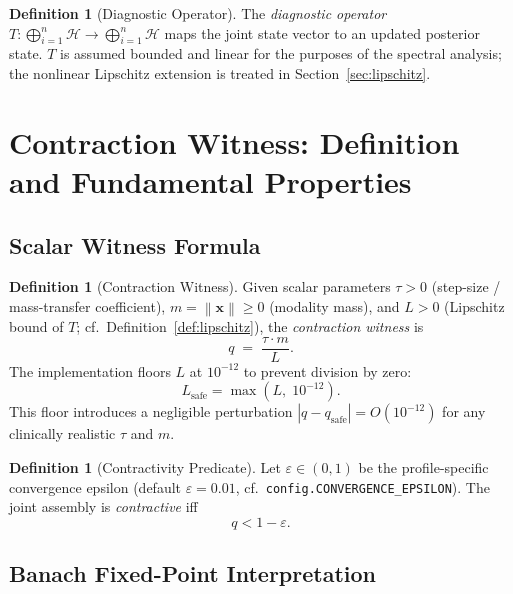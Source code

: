 \documentclass[11pt,a4paper]{article}
\theoremstyle{tealstyle}
\theoremstyle{definition}
\newtheorem{definition}[theorem]{Definition}
\newcommand{\Hilb}{\mathcal{H}}
\newcommand{\norm}[1]{\left\lVert #1 \right\rVert}
\newcommand{\abs}[1]{\left\lvert #1 \right\rvert}
\newcommand{\eps}{\varepsilon}
\newcommand{\qwit}{q}
\newcommand{\Tau}{\tau}
\begin{document}
\begin{definition}[Diagnostic Operator]
\label{def:operator}
The \emph{diagnostic operator}
$T\colon \bigoplus_{i=1}^n \Hilb \to \bigoplus_{i=1}^n \Hilb$
maps the joint state vector to an updated posterior state.
$T$ is assumed bounded and linear for the purposes of the spectral analysis;
the nonlinear Lipschitz extension is treated in
Section~\ref{sec:lipschitz}.
\end{definition}

\section{Contraction Witness: Definition and Fundamental Properties}
\label{sec:witness}

\subsection{Scalar Witness Formula}
\label{sec:witness-formula}

\begin{definition}[Contraction Witness]
\label{def:witness}
Given scalar parameters $\Tau > 0$ (step-size / mass-transfer coefficient),
$m = \norm{\bm{x}} \ge 0$ (modality mass), and
$L > 0$ (Lipschitz bound of $T$; cf.\ Definition~\ref{def:lipschitz}),
the \emph{contraction witness} is
\begin{equation}
  \label{eq:witness}
  \qwit \;=\; \frac{\Tau \cdot m}{L}.
\end{equation}
The implementation floors $L$ at $10^{-12}$ to prevent division by zero:
\[
  L_{\text{safe}} = \max(L,\;10^{-12}).
\]
This floor introduces a negligible perturbation
$\abs{\qwit - \qwit_{\text{safe}}} = O(10^{-12})$ for any clinically
realistic $\Tau$ and $m$.
\end{definition}

\begin{definition}[Contractivity Predicate]
\label{def:contractive}
Let $\eps \in (0,1)$ be the profile-specific convergence epsilon
(default $\eps = 0.01$, cf.\ \texttt{config.CONVERGENCE\_EPSILON}).
The joint assembly is \emph{contractive} iff
\begin{equation}
  \label{eq:contractive}
  \qwit < 1 - \eps.
\end{equation}
\end{definition}

\subsection{Banach Fixed-Point Interpretation}
\end{document}
